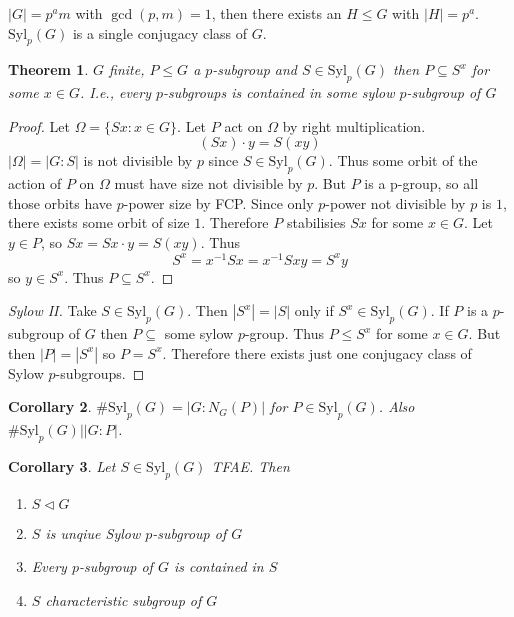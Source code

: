 \documentclass[a4paper,10pt]{article}
\newtheorem{thm}{Theorem}
\newtheorem{Cor}[thm]{Corollary}
\begin{document}
$|G| = p^a m$ with $\gcd(p, m) =1$, then there exists an $H \leq G$ with $|H| = p^a$. $\text{Syl}_p(G)$ is a single conjugacy class of $G$. 

\begin{thm}
$G$ finite, $P \leq G$ a $p$-subgroup and $S \in \text{Syl}_p(G)$ then $P \subseteq S^x$ for some $x \in G$. I.e., every $p$-subgroups is contained in some sylow $p$-subgroup of $G$
\end{thm}

\begin{proof}
Let $\Omega = \{ Sx : x \in G\}$. Let $P$ act on $\Omega$ by right multiplication. 
\[ (Sx) \cdot y = S(xy) \]
$|\Omega| = |G : S|$ is not divisible by $p$ since $S \in \text{Syl}_p(G)$. Thus some orbit of the action of $P$ on $\Omega$ must have size not divisible by $p$. But $P$ is a p-group, so all those orbits have $p$-power size by FCP. Since only $p$-power not divisible by $p$ is $1$, there exists some orbit of size $1$. Therefore $P$ stabilisies $Sx$ for some $x \in G$. Let $y \in P$, so $Sx = Sx \cdot y = S(xy)$. Thus
\[ S^x = x^{-1} S x = x^{-1} S xy = S^x y \]
so $y \in S^x$. Thus $P \subseteq S^x$.
\end{proof}

\begin{proof}[Sylow II]
Take $S \in \text{Syl}_p(G)$. Then $|S^x| = |S|$ only if $S^x \in \text{Syl}_p(G)$. If $P$ is a $p$-subgroup of $G$ then $P \subseteq $ some sylow $p$-group. Thus $P \leq S^x$ for some $x \in G$. But then $|P| = |S^x|$ so $P = S^x$. Therefore there exists just one conjugacy class of Sylow $p$-subgroups. 
\end{proof}

\begin{Cor}
$\# \text{Syl}_p(G) = | G : N_G(P) |$ for $P \in \text{Syl}_p(G)$. Also $\# \text{Syl}_p(G) \big| |G :P|$.
\end{Cor}


\begin{Cor}
Let $S \in \text{Syl}_p(G)$ TFAE. Then
\begin{enumerate}
\item $S \triangleleft G$
\item $S$ is unqiue Sylow $p$-subgroup of $G$
\item Every $p$-subgroup of $G$ is contained in $S$
\item $S$ characteristic subgroup of $G$
\end{enumerate}

\end{Cor}
\end{document}
